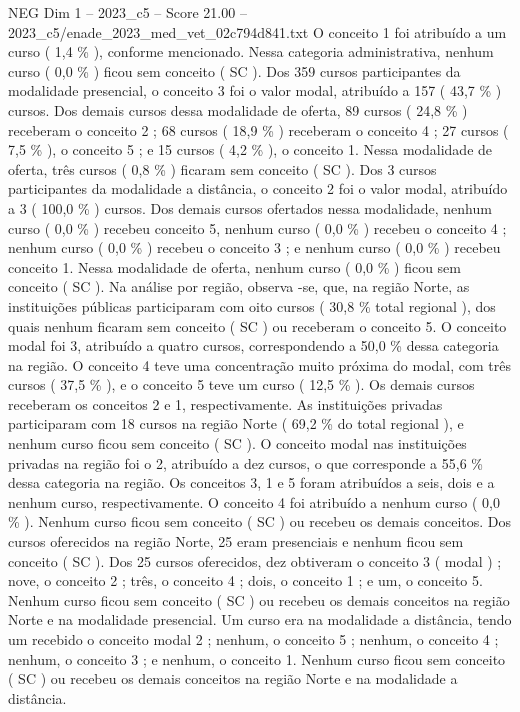 \begin{textsample}{NEG Dim 1 – 2023\_c5 – Score 21.00 – 2023\_c5/enade\_2023\_med\_vet\_02c794d841.txt}
O conceito 1 foi atribuído a um curso ( 1,4 \% ), conforme mencionado.
Nessa categoria administrativa, nenhum curso ( 0,0 \% ) ficou sem conceito ( SC ).
Dos 359 cursos participantes da modalidade presencial, o conceito 3 foi o valor modal, atribuído a 157 ( 43,7 \% ) cursos.
Dos demais cursos dessa modalidade de oferta, 89 cursos ( 24,8 \% ) receberam o conceito 2 ; 68 cursos ( 18,9 \% ) receberam o conceito 4 ; 27 cursos ( 7,5 \% ), o conceito 5 ; e 15 cursos ( 4,2 \% ), o conceito 1.
Nessa modalidade de oferta, três cursos ( 0,8 \% ) ficaram sem conceito ( SC ).
Dos 3 cursos participantes da modalidade a distância, o conceito 2 foi o valor modal, atribuído a 3 ( 100,0 \% ) cursos.
Dos demais cursos ofertados nessa modalidade, nenhum curso ( 0,0 \% ) recebeu conceito 5, nenhum curso ( 0,0 \% ) recebeu o conceito 4 ; nenhum curso ( 0,0 \% ) recebeu o conceito 3 ; e nenhum curso ( 0,0 \% ) recebeu conceito 1.
Nessa modalidade de oferta, nenhum curso ( 0,0 \% ) ficou sem conceito ( SC ).
Na análise por região, observa -se, que, na região Norte, as instituições públicas participaram com oito cursos ( 30,8 \% total regional ), dos quais nenhum ficaram sem conceito ( SC ) ou receberam o conceito 5.
O conceito modal foi 3, atribuído a quatro cursos, correspondendo a 50,0 \% dessa categoria na região.
O conceito 4 teve uma concentração muito próxima do modal, com três cursos ( 37,5 \% ), e o conceito 5 teve um curso ( 12,5 \% ).
Os demais cursos receberam os conceitos 2 e 1, respectivamente.
As instituições privadas participaram com 18 cursos na região Norte ( 69,2 \% do total regional ), e nenhum curso ficou sem conceito ( SC ).
O conceito modal nas instituições privadas na região foi o 2, atribuído a dez cursos, o que corresponde a 55,6 \% dessa categoria na região.
Os conceitos 3, 1 e 5 foram atribuídos a seis, dois e a nenhum curso, respectivamente.
O conceito 4 foi atribuído a nenhum curso ( 0,0 \% ).
Nenhum curso ficou sem conceito ( SC ) ou recebeu os demais conceitos.
Dos cursos oferecidos na região Norte, 25 eram presenciais e nenhum ficou sem conceito ( SC ).
Dos 25 cursos oferecidos, dez obtiveram o conceito 3 ( modal ) ; nove, o conceito 2 ; três, o conceito 4 ; dois, o conceito 1 ; e um, o conceito 5.
Nenhum curso ficou sem conceito ( SC ) ou recebeu os demais conceitos na região Norte e na modalidade presencial.
Um curso era na modalidade a distância, tendo um recebido o conceito modal 2 ; nenhum, o conceito 5 ; nenhum, o conceito 4 ; nenhum, o conceito 3 ; e nenhum, o conceito 1.
Nenhum curso ficou sem conceito ( SC ) ou recebeu os demais conceitos na região Norte e na modalidade a distância.

\end{textsample}

